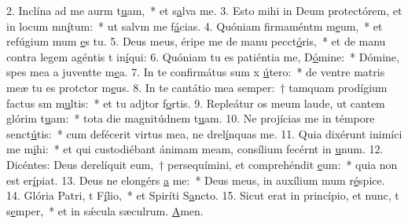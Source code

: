 2. Inclína ad me aurm t\uline{u}am,~* et s\uline{a}lva me.
3. Esto mihi in Deum protectórem, et in locum mn\uline{í}tum:~* ut salvm me f\uline{á}cias.
4. Quóniam firmaméntm m\uline{e}um,~* et refúgium mum \uline{e}s tu.
5. Deus meus, éripe me de manu pecct\uline{ó}ris,~* et de manu contra legem agéntis t in\uline{í}qui:
6. Quóniam tu es patiéntia me, D\uline{ó}mine:~* Dómine, spes mea a juventte m\uline{e}a.
7. In te confirmátus sum x \uline{ú}tero:~* de ventre matris meæ tu es protctor m\uline{e}us.
8. In te cantátio mea semper:~† tamquam prodígium factus sm m\uline{u}ltis:~* et tu adjtor f\uline{o}rtis.
9. Repleátur os meum laude, ut cantem glórim t\uline{u}am:~* tota die magnitúdnem t\uline{u}am.
10. Ne projícias me in témpore senct\uline{ú}tis:~* cum defécerit virtus mea, ne drel\uline{í}nquas me.
11. Quia dixérunt inimíci me m\uline{i}hi:~* et qui custodiébant ánimam meam, consílium fecérnt in \uline{u}num.
12. Dicéntes: Deus derelíquit eum,~† persequímini, et comprehéndit \uline{e}um:~* quia non est  er\uline{í}piat.
13. Deus ne elongérs \uline{a} me:~* Deus meus, in auxílium mum r\uline{é}spice.
14. Glória Patri, t F\uline{í}lio,~* et Spiríti S\uline{a}ncto.
15. Sicut erat in princípio, et nunc, t s\uline{e}mper,~* et in sǽcula sæculrum. \uline{A}men.

